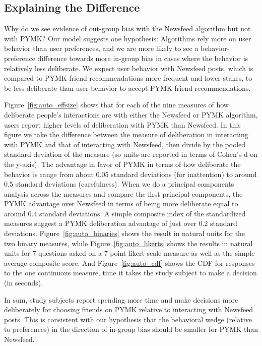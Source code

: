 \documentclass[12pt,letterpaper]{article}
\begin{document}
\subsection{Explaining the Difference}
Why do we see evidence of out-group bias with the Newsfeed algorithm but not with PYMK? Our model suggests one hypothesis: Algorithms rely more on user behavior than user preferences, and we are more likely to see a behavior-preference difference towards more in-group bias in cases where the behavior is relatively less deliberate. We expect user behavior with Newsfeed posts, which is compared to PYMK friend recommendations more frequent and lower-stakes, to be less deliberate than user behavior to accept PYMK friend recommendations. 

Figure~\ref{fig:auto_effsize} shows that for each of the nine measures of how deliberate people's interactions are with either the Newsfeed or PYMK algorithm, users report higher levels of deliberation with PYMK than Newsfeed. In this figure we take the difference between the measure of deliberation in interacting with PYMK and that of interacting with Newsfeed, then divide by the pooled standard deviation of the measure (so units are reported in terms of Cohen's d on the y-axis). The advantage in favor of PYMK in terms of how deliberate the behavior is range from about 0.05 standard deviations (for inattention) to around 0.5 standard deviations (carefulness). When we do a principal components analysis across the measures and compare the first principal components, the PYMK advantage over Newsfeed in terms of being more deliberate equal to around 0.4 standard deviations. A simple composite index of the standardized measures suggest a PYMK deliberation advantage of just over 0.2 standard deviations. Figure~\ref{fig:auto_binaries} shows the result in natural units for the two binary measures, while Figure~\ref{fig:auto_likerts} shows the results in natural units for 7 questions asked on a 7-point likert scale measure as well as the simple average composite score. And Figure~\ref{fig:auto_cdf} shows the CDF for responses to the one continuous measure, time it takes the study subject to make a decision (in seconds).

In sum, study subjects report spending more time and make decisions more deliberately for choosing friends on PYMK relative to interacting with Newsfeed posts. This is consistent with our hypothesis that the behavioral wedge (relative to preferences) in the direction of in-group bias should be smaller for PYMK than Newsfeed.
\end{document}
